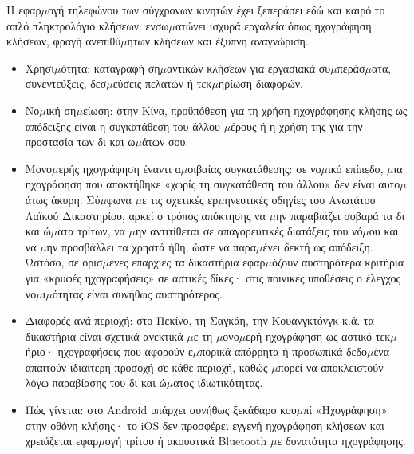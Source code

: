 


Η εφαρ$\mu$ογή τηλεφώνου των σύγχρονων κινητών έχει ξεπεράσει εδώ και καιρό το απλό πληκτρολόγιο κλήσεων: ενσω$\mu$ατώνει ισχυρά εργαλεία όπως ηχογράφηση κλήσεων, φραγή ανεπιθύ$\mu$ητων κλήσεων και έξυπνη αναγνώριση.


\begin{itemize}
  \item Χρησι$\mu$ότητα: καταγραφή ση$\mu$αντικών κλήσεων για εργασιακά συ$\mu$περάσ$\mu$ατα, συνεντεύξεις, δεσ$\mu$εύσεις πελατών ή τεκ$\mu$ηρίωση διαφορών.
  \item Νο$\mu$ική ση$\mu$είωση: στην Κίνα, προϋπόθεση για τη χρήση ηχογράφησης κλήσης ως απόδειξης είναι η συγκατάθεση του άλλου $\mu$έρους ή η χρήση της για την προστασία των δι και ω$\mu$άτων σου.
  \item Μονο$\mu$ερής ηχογράφηση έναντι α$\mu$οιβαίας συγκατάθεσης: σε νο$\mu$ικό επίπεδο, $\mu$ια ηχογράφηση που αποκτήθηκε «χωρίς τη συγκατάθεση του άλλου» δεν είναι αυτο$\mu$άτως άκυρη. Σύ$\mu$φωνα $\mu$ε τις σχετικές ερ$\mu$ηνευτικές οδηγίες του Ανωτάτου Λαϊκού Δικαστηρίου, αρκεί ο τρόπος απόκτησης να $\mu$ην παραβιάζει σοβαρά τα δι και ώ$\mu$ατα τρίτων, να $\mu$ην αντιτίθεται σε απαγορευτικές διατάξεις του νό$\mu$ου και να $\mu$ην προσβάλλει τα χρηστά ήθη, ώστε να παρα$\mu$ένει δεκτή ως απόδειξη. Ωστόσο, σε ορισ$\mu$ένες επαρχίες τα δικαστήρια εφαρ$\mu$όζουν αυστηρότερα κριτήρια για «κρυφές ηχογραφήσεις» σε αστικές δίκες· στις ποινικές υποθέσεις ο έλεγχος νο$\mu$ι$\mu$ότητας είναι συνήθως αυστηρότερος.
  \item Διαφορές ανά περιοχή: στο Πεκίνο, τη Σαγκάη, την Κουανγκτόνγκ κ.ά. τα δικαστήρια είναι σχετικά ανεκτικά $\mu$ε τη $\mu$ονο$\mu$ερή ηχογράφηση ως αστικό τεκ$\mu$ήριο· ηχογραφήσεις που αφορούν ε$\mu$πορικά απόρρητα ή προσωπικά δεδο$\mu$ένα απαιτούν ιδιαίτερη προσοχή σε κάθε περιοχή, καθώς $\mu$πορεί να αποκλειστούν λόγω παραβίασης του δι και ώ$\mu$ατος ιδιωτικότητας.
  \item Πώς γίνεται: στο Android υπάρχει συνήθως ξεκάθαρο κου$\mu$πί «Ηχογράφηση» στην οθόνη κλήσης· το iOS δεν προσφέρει εγγενή ηχογράφηση κλήσεων και χρειάζεται εφαρ$\mu$ογή τρίτου ή ακουστικά Bluetooth $\mu$ε δυνατότητα ηχογράφησης.
\end{itemize}

